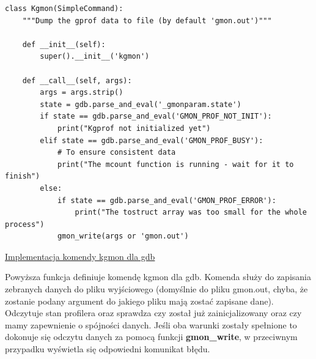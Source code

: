 \documentclass[shortabstract]{iithesis}
\theoremstyle{definition} \newtheorem*{definition}{Definicja}
\theoremstyle{definition} \newtheorem*{example}{Przykład}
\theoremstyle{definition} \newtheorem*{remark}{Uwaga}
\newenvironment{longlisting}{\captionsetup{type=listing}}{}
\begin{document}
\begin{longlisting}
  \begin{verbatim}
class Kgmon(SimpleCommand):
    """Dump the gprof data to file (by default 'gmon.out')"""

    def __init__(self):
        super().__init__('kgmon')

    def __call__(self, args):
        args = args.strip()
        state = gdb.parse_and_eval('_gmonparam.state')
        if state == gdb.parse_and_eval('GMON_PROF_NOT_INIT'):
            print("Kgprof not initialized yet")
        elif state == gdb.parse_and_eval('GMON_PROF_BUSY'):
            # To ensure consistent data
            print("The mcount function is running - wait for it to finish")
        else:
            if state == gdb.parse_and_eval('GMON_PROF_ERROR'):
                print("The tostruct array was too small for the whole process")
            gmon_write(args or 'gmon.out')

  \end{verbatim}
  \caption{\href{https://mimiker.ii.uni.wroc.pl/source/xref/mimiker/sys/debug/kgmon.py?r=624198e4\#56}{Implementacja komendy kgmon dla gdb}}
   \label{lst:funckgmon}
\end{longlisting}

Powyższa funkcja definiuje komendę kgmon dla gdb. Komenda służy do zapisania zebranych danych do pliku wyjściowego (domyślnie do pliku gmon.out, chyba, że zostanie podany argument do jakiego pliku mają zostać zapisane dane). Odczytuje stan profilera oraz sprawdza czy został już zainicjalizowany oraz czy mamy zapewnienie o spójności danych. Jeśli oba warunki zostały spełnione to dokonuje się odczytu danych za pomocą funkcji \textbf{gmon\_write}, w przeciwnym przypadku wyświetla się odpowiedni komunikat błędu.
\end{document}
